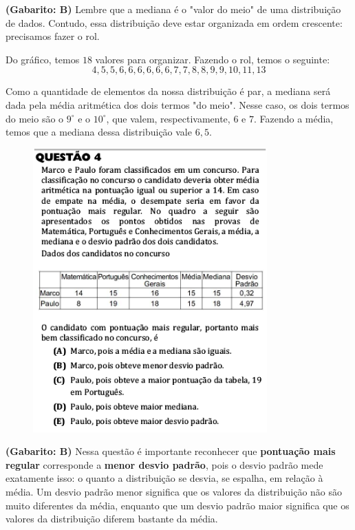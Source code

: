 \documentclass[a4paper]{article}
\begin{document}
\par \textbf{(Gabarito: B)} Lembre que a mediana é o "valor do meio" de uma distribuição de dados. Contudo, essa distribuição deve estar organizada em ordem crescente: precisamos fazer o rol. 
\par\vspace{0.3cm} Do gráfico, temos $18$ valores para organizar. Fazendo o rol, temos o seguinte:
\begin{equation*}
4, 5, 5, 6, 6, 6, 6, 6, 6, 7, 7, 8, 8, 9, 9, 10, 11, 13
\end{equation*}
\par\vspace{0.3cm} Como a quantidade de elementos da nossa distribuição é par, a mediana será dada pela média aritmética dos dois termos "do meio". Nesse caso, os dois termos do meio são o $9^\circ$ e o $10^\circ$, que valem, respectivamente, $6$ e $7$. Fazendo a média, temos que a mediana dessa distribuição vale $6,5$.
\begin{figure}[H]
	\begin{center}
		\includegraphics[width=9cm]{L1Q4.png}
	\end{center}
\end{figure}
\par \textbf{(Gabarito: B)} Nessa questão é importante reconhecer que \textbf{pontuação mais regular} corresponde a \textbf{menor desvio padrão}, pois o desvio padrão mede exatamente isso: o quanto a distribuição se desvia, se espalha, em relação à média. Um desvio padrão menor significa que os valores da distribuição não são muito diferentes da média, enquanto que um desvio padrão maior significa que os valores da distribuição diferem bastante da média.
\end{document}
